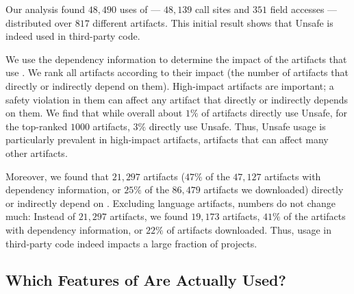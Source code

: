 Our analysis found $48,490$ uses of  --- $48,139$ call sites and $351$ field accesses --- distributed over $817$ different artifacts.
This initial result shows that Unsafe is indeed used in third-party code.

We use the dependency information to determine the impact of the artifacts that use .
We rank all artifacts according to their impact (the number of artifacts that directly or indirectly depend on them).
High-impact artifacts are important;
a safety violation in them can affect any artifact that directly or indirectly depends on them.
We find that while overall about $1\%$ of artifacts directly use Unsafe,
for the top-ranked $1000$ artifacts, $3\%$ directly use Unsafe.
Thus, Unsafe usage is particularly prevalent in high-impact artifacts, artifacts that can affect many other artifacts.

Moreover, we found that $21,297$ artifacts ($47\%$ of the $47,127$ artifacts with dependency information, or $25\%$ of the $86,479$ artifacts we downloaded) directly or indirectly depend on .
Excluding language artifacts, numbers do not change much:
Instead of $21,297$ artifacts, we found $19,173$ artifacts,
$41\%$ of the artifacts with dependency information, or $22\%$ of artifacts downloaded.
Thus,  usage in third-party code indeed impacts a large fraction of projects.


\subsection*{Which Features of \unsafe{} Are Actually Used?}

